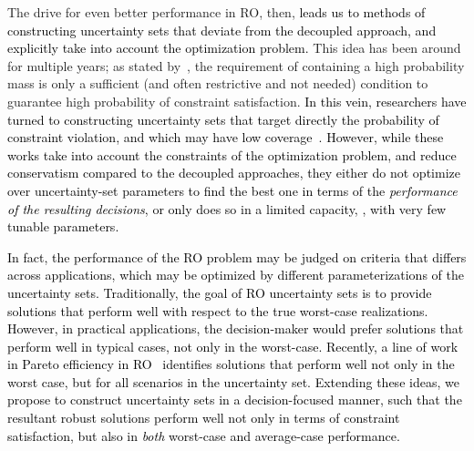 \documentclass[11pt]{article}
\newcommand{\bsnote}[1]{\noindent\textcolor{red}{\texttt{Bartolomeo: #1}}}
\newcommand{\RC}[1]{\textcolor{black}{#1}}
\begin{document}
The drive for even better performance in \gls{RO}, then, \RC{leads us to methods of constructing uncertainty sets that deviate from the decoupled approach, and explicitly take into account the optimization problem.}
This idea has been around for multiple years; as stated by~\cite{ben-tal_robust_2009}, the requirement of containing a high probability mass is only a sufficient (and often restrictive and not needed) condition to guarantee high probability of constraint satisfaction.
\RC{In this vein, researchers have turned to constructing uncertainty sets that target directly the probability of constraint violation, and which may have low coverage~\citep{bertsimas_price_2004,bertsimas_probabilistic,scenario}.
}
\RC{However, while these works take into account the constraints of the optimization problem, and reduce conservatism compared to the decoupled approaches, they either do not optimize over uncertainty-set parameters to find the best one in terms of the {\it performance of the resulting decisions},
or only does so in a limited capacity, \ie, with very few tunable parameters.}

\RC{In fact, the performance of the \gls{RO} problem may be judged on criteria that differs across applications, which may be optimized by different parameterizations of the uncertainty sets.}
\RC{Traditionally, the goal of \gls{RO} uncertainty sets is to provide solutions that perform well with respect to the true worst-case realizations. However, in practical applications, the decision-maker would prefer solutions that perform well in typical cases, not only in the worst-case. Recently, a line of work in Pareto efficiency in \gls{RO}~\citep{pareto,pareto1,pareto3} identifies solutions that perform well not only in the worst case, but for all scenarios in the uncertainty set.
Extending these ideas, we propose to construct uncertainty sets in a decision-focused manner,
such that the resultant robust solutions perform well not only in terms of constraint satisfaction, but also in {\it both} worst-case and average-case performance.}
\end{document}
